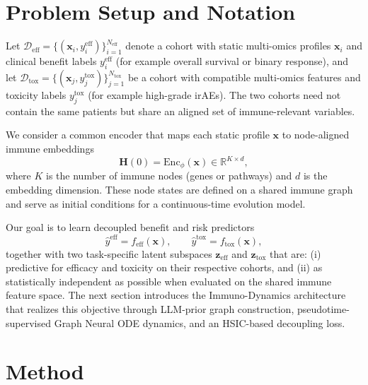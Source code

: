 \documentclass{article}
\begin{document}
\section{Problem Setup and Notation}
\label{sec:setup}

Let $\mathcal{D}_{\text{eff}}=\{(\mathbf{x}_i,y_i^{\text{eff}})\}_{i=1}^{N_{\text{eff}}}$ denote a cohort with static multi-omics profiles $\mathbf{x}_i$ and clinical benefit labels $y_i^{\text{eff}}$ (for example overall survival or binary response), and let $\mathcal{D}_{\text{tox}}=\{(\mathbf{x}_j,y_j^{\text{tox}})\}_{j=1}^{N_{\text{tox}}}$ be a cohort with compatible multi-omics features and toxicity labels $y_j^{\text{tox}}$ (for example high-grade irAEs). The two cohorts need not contain the same patients but share an aligned set of immune-relevant variables.

We consider a common encoder that maps each static profile $\mathbf{x}$ to node-aligned immune embeddings
\begin{equation}
\mathbf{H}(0)=\mathrm{Enc}_{\phi}(\mathbf{x})\in\mathbb{R}^{K\times d},
\end{equation}
where $K$ is the number of immune nodes (genes or pathways) and $d$ is the embedding dimension. These node states are defined on a shared immune graph and serve as initial conditions for a continuous-time evolution model.

Our goal is to learn decoupled benefit and risk predictors
\begin{equation}
\hat{y}^{\text{eff}}=f_{\text{eff}}(\mathbf{x}), \qquad
\hat{y}^{\text{tox}}=f_{\text{tox}}(\mathbf{x}),
\end{equation}
together with two task-specific latent subspaces $\mathbf{z}_{\text{eff}}$ and $\mathbf{z}_{\text{tox}}$ that are:
(i) predictive for efficacy and toxicity on their respective cohorts, and
(ii) as statistically independent as possible when evaluated on the shared immune feature space. The next section introduces the Immuno-Dynamics architecture that realizes this objective through LLM-prior graph construction, pseudotime-supervised Graph Neural ODE dynamics, and an HSIC-based decoupling loss.

\section{Method}
\label{sec:method}
\end{document}
